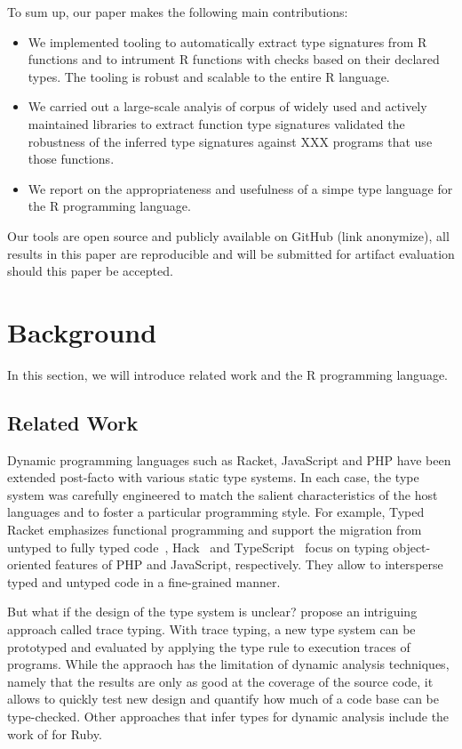 \documentclass[acmsmall,review,anonymous]{acmart}\settopmatter{printfolios=true,printccs=false,printacmref=false}
\begin{document}
To sum up, our paper makes the following main contributions:
\begin{itemize}
\item We implemented tooling to automatically extract type signatures from R
  functions and to intrument R functions with checks based on their declared
  types. The tooling is robust and scalable to the entire R language.
\item We carried out a large-scale analyis of corpus of \PACKAGES widely
  used and actively maintained libraries to extract function type signatures
  validated the robustness of the inferred type signatures against XXX
  programs that use those functions.
\item We report on the appropriateness and usefulness of a simpe type
  language for the R programming language.
\end{itemize}

Our tools are open source and publicly available on GitHub (link anonymize),
all results in this paper are reproducible and will be submitted for
artifact evaluation should this paper be accepted.
%
\section{Background} %

In this section, we will introduce related work and the R programming language.

\subsection{Related Work}

Dynamic programming languages such as Racket, JavaScript and PHP have been
extended post-facto with various static type systems.  In each case, the
type system was carefully engineered to match the salient characteristics of
the host languages and to foster a particular programming style. For
example, Typed Racket emphasizes functional programming and support the
migration from untyped to fully typed code~\cite{tf-popl08},
Hack~\cite{hack13} and TypeScript~\cite{BAT14} focus on typing
object-oriented features of PHP and JavaScript, respectively. They allow to
intersperse typed and untyped code in a fine-grained manner.

But what if the design of the type system is unclear?  \citet{tip} propose
an intriguing approach called trace typing. With trace typing, a new type
system can be prototyped and evaluated by applying the type rule to
execution traces of programs. While the appraoch has the limitation of
dynamic analysis techniques, namely that the results are only as good at the
coverage of the source code, it allows to quickly test new design and
quantify how much of a code base can be type-checked.  Other approaches that
infer types for dynamic analysis include the work of \citet{FurrAF2009} for
Ruby.
\end{document}
